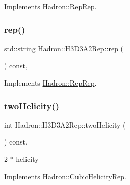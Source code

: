 Implements \mbox{\hyperlink{structHadron_1_1RepRep_ab3213025f6de249f7095892109575fde}{Hadron\+::\+Rep\+Rep}}.

\mbox{\label{structHadron_1_1H3D3A2Rep_a2634fb1518fc2bc1d80d435e4e83aff3}} 
\subsubsection{\texorpdfstring{rep()}{rep()}\hspace{0.1cm}{\footnotesize\ttfamily [5/5]}}
{\footnotesize\ttfamily std\+::string Hadron\+::\+H3\+D3\+A2\+Rep\+::rep (\begin{DoxyParamCaption}{ }\end{DoxyParamCaption}) const\hspace{0.3cm}{\ttfamily [inline]}, {\ttfamily [virtual]}}



Implements \mbox{\hyperlink{structHadron_1_1RepRep_ab3213025f6de249f7095892109575fde}{Hadron\+::\+Rep\+Rep}}.

\mbox{\label{structHadron_1_1H3D3A2Rep_a9a02375c619de009aa21e02062e23dac}} 
\subsubsection{\texorpdfstring{twoHelicity()}{twoHelicity()}\hspace{0.1cm}{\footnotesize\ttfamily [1/3]}}
{\footnotesize\ttfamily int Hadron\+::\+H3\+D3\+A2\+Rep\+::two\+Helicity (\begin{DoxyParamCaption}{ }\end{DoxyParamCaption}) const\hspace{0.3cm}{\ttfamily [inline]}, {\ttfamily [virtual]}}

2 $\ast$ helicity 

Implements \mbox{\hyperlink{structHadron_1_1CubicHelicityRep_af507aa56fc2747eacc8cb6c96db31ecc}{Hadron\+::\+Cubic\+Helicity\+Rep}}.

\mbox{\label{structHadron_1_1H3D3A2Rep_a9a02375c619de009aa21e02062e23dac}} 
